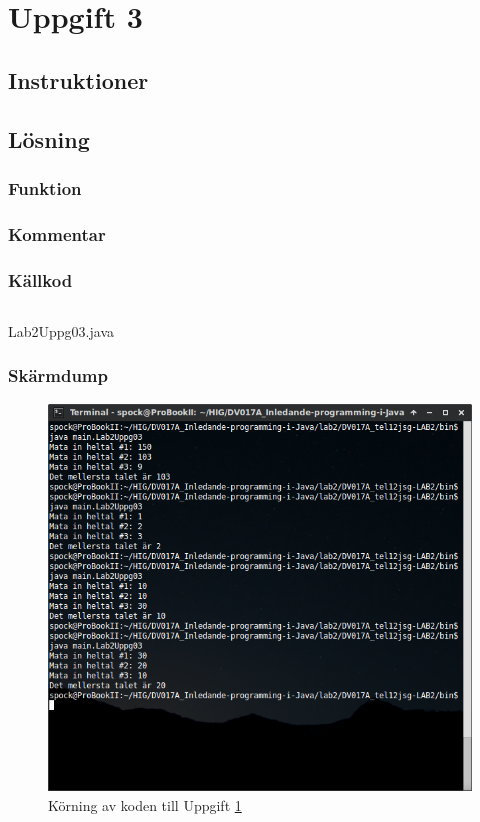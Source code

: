 \section{Uppgift 3}\label{sec:uppg03}

\subsection{Instruktioner}


\subsection{Lösning}
\subsubsection{Funktion}

\subsubsection{Kommentar}


\subsubsection{Källkod}
\inputminted[linenos]{java}{src/Lab2Uppg03.java}
\caption{Lab2Uppg03.java}
\label{src:uppg03}


\subsubsection{Skärmdump}
\begin{figure}[htbp]
    \centering
        \includegraphics[width=\linewidth]{img/03.png}
    \caption{Körning av koden till Uppgift \ref{sec:uppg03}}
    \label{fig:uppg03-screenshot}
\end{figure}

